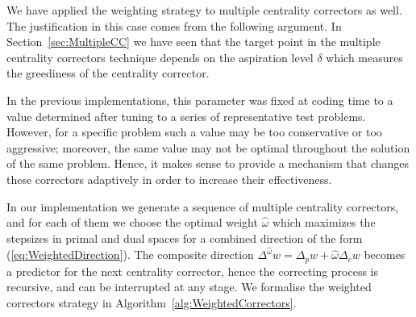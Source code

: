 
We have applied the weighting strategy to multiple centrality correctors 
as well. The justification in this case comes from the following argument.
In Section~\ref{sec:MultipleCC} we have seen that the target point 
in the multiple centrality correctors technique depends on the
aspiration level
$\delta$ which measures the greediness of the centrality corrector. 

In the previous implementations, this parameter was fixed at coding time 
to a value determined after tuning to a series of representative 
test problems. However, for a specific problem such a value may be 
too conservative or too aggressive; moreover, the same value may not 
be optimal throughout the solution of the same problem. 
Hence, it makes sense to provide 
a mechanism that changes these correctors adaptively in order 
to increase their effectiveness.


In our implementation we generate a sequence of multiple centrality 
correctors, and for each of them we choose the optimal weight 
$\hat \omega$ which maximizes the stepsizes in primal and dual spaces 
for a combined direction of the form (\ref{eq:WeightedDirection}).
The composite direction 
$\Delta^{\hat\omega} w = \Delta_p w + \hat\omega \Delta_c w$ becomes
a predictor for the next centrality corrector, hence the correcting process
is recursive, and can be interrupted at any stage.
We formalise the weighted correctors strategy in 
Algorithm~\ref{alg:WeightedCorrectors}.

